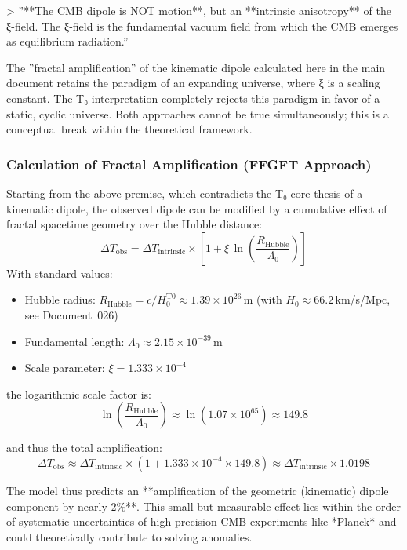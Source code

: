 	> ''**The CMB dipole is NOT motion**, but an **intrinsic anisotropy** of the ξ-field. The ξ-field is the fundamental vacuum field from which the CMB emerges as equilibrium radiation.''
	
	The ''fractal amplification'' of the kinematic dipole calculated here in the main document retains the paradigm of an expanding universe, where ξ is a scaling constant. The T₀ interpretation completely rejects this paradigm in favor of a static, cyclic universe. Both approaches cannot be true simultaneously; this is a conceptual break within the theoretical framework.
	
	\subsubsection*{Calculation of Fractal Amplification (FFGFT Approach)}
	
	Starting from the above premise, which contradicts the T₀ core thesis of a kinematic dipole, the observed dipole can be modified by a cumulative effect of fractal spacetime geometry over the Hubble distance:
	\[
	\Delta T_{\text{obs}} = \Delta T_{\text{intrinsic}} \times \left[1 + \xi \, \ln\left(\frac{R_{\text{Hubble}}}{\Lambda_0}\right)\right]
	\]
	With standard values:
	\begin{itemize}
		\item Hubble radius: $R_{\text{Hubble}} = c/H_0^{\text{T0}} \approx 1.39 \times 10^{26} \, \text{m}$ (with $H_0 \approx 66.2\,$km/s/Mpc, see Document~026)
		\item Fundamental length: $\Lambda_0 \approx 2.15 \times 10^{-39} \, \text{m}$
		\item Scale parameter: $\xi = 1.333 \times 10^{-4}$
	\end{itemize}
	
	the logarithmic scale factor is:
	\[
	\ln\left(\frac{R_{\text{Hubble}}}{\Lambda_0}\right) \approx \ln(1.07 \times 10^{65}) \approx 149.8
	\]
	
	and thus the total amplification:
	\[
	\Delta T_{\text{obs}} \approx \Delta T_{\text{intrinsic}} \times (1 + 1.333\times10^{-4} \times 149.8) \approx \Delta T_{\text{intrinsic}} \times 1.0198
	\]
	
	The model thus predicts an **amplification of the geometric (kinematic) dipole component by nearly 2\%**. This small but measurable effect lies within the order of systematic uncertainties of high-precision CMB experiments like *Planck* and could theoretically contribute to solving anomalies.
	
